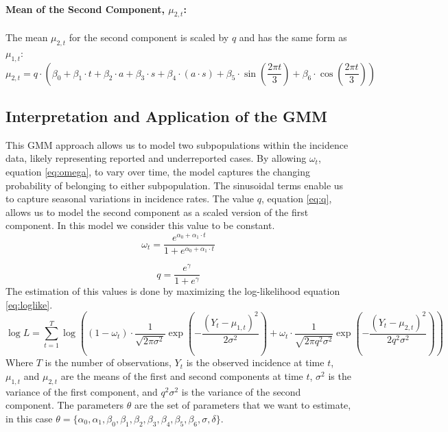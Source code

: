 \documentclass[a4paper,12pt]{article}
\begin{document}
\paragraph{Mean of the Second Component, \( \mu_{2,t} \):}
The mean \( \mu_{2,t} \) for the second component is scaled by \( q \) and has the same form as \( \mu_{1,t} \):
\[
\mu_{2,t} = q \cdot \left( \beta_0 + \beta_1 \cdot t + \beta_2 \cdot a + \beta_3 \cdot s + \beta_4 \cdot (a \cdot s) + \beta_5 \cdot \sin\left(\frac{2 \pi t}{3}\right) + \beta_6 \cdot \cos\left(\frac{2 \pi t}{3}\right) \right)
\]

\subsection{Interpretation and Application of the GMM}
This GMM approach allows us to model two subpopulations within the incidence data, likely representing reported and underreported cases. By allowing \( \omega_t \), equation \ref{eq:omega}, to vary over time, the model captures the changing probability of belonging to either subpopulation. The sinusoidal terms enable us to capture seasonal variations in incidence rates. The value $q$, equation \ref{eq:q}, allows us to model the second component as a scaled version of the first component. In this model we consider this value to be constant.
\begin{equation}\label{eq:omega}
    \omega_t = \frac{e^{\alpha_0 + \alpha_1 \cdot t}}{1 + e^{\alpha_0 + \alpha_1 \cdot t}}
\end{equation}

\begin{equation}\label{eq:q}
    q = \frac{e^{\gamma}}{1 + e^{\gamma}}
\end{equation}
The estimation of this values is done by maximizing the log-likelihood equation \ref{eq:loglike}.
\begin{equation}
    \log L = \sum_{t=1}^{T} \log \left( (1 - \omega_t) \cdot \frac{1}{\sqrt{2 \pi \sigma^2}} \exp\left(-\frac{(Y_t - \mu_{1,t})^2}{2 \sigma^2}\right) + \omega_t \cdot \frac{1}{\sqrt{2 \pi q^2 \sigma^2}} \exp\left(-\frac{(Y_t - \mu_{2,t})^2}{2 q^2 \sigma^2}\right) \right)
    \label{eq:loglike}
\end{equation}
Where \( T \) is the number of observations, \( Y_t \) is the observed incidence at time \( t \), \( \mu_{1,t} \) and \( \mu_{2,t} \) are the means of the first and second components at time \( t \), \( \sigma^2 \) is the variance of the first component, and \( q^2 \sigma^2 \) is the variance of the second component. The parameters $\theta$ are the set of parameters that we want to estimate, in this case $\theta = \{\alpha_0, \alpha_1, \beta_0, \beta_1, \beta_2, \beta_3, \beta_4, \beta_5, \beta_6, \sigma, \delta\}$.
\end{document}
